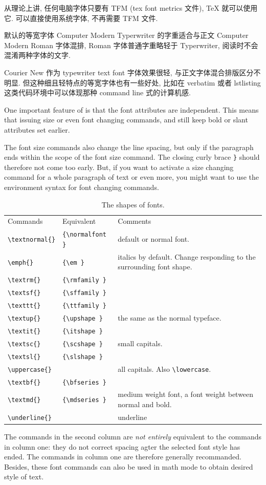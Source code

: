 \documentclass[a4paper,oneside]{book}
\begin{document}
从理论上讲, 任何电脑字体只要有 TFM (tex font metrics 文件), \TeX{} 就可以使用它. \XeTeX{} 可以直接使用系统字体, 不再需要 TFM 文件.

默认的等宽字体 Computer Modern Typerwriter 的字重适合与正文 Computer Modern Roman 字体混排, Roman 字体普通字重略轻于 Typerwriter, 阅读时不会混淆两种字体的文字.

Courier New 作为 typewriter text font 字体效果很轻, 与正文字体混合排版区分不明显. 但这种细且轻特点的等宽字体也有一些好处, 比如在 verbatim 或者 lstlisting 这类代码环境中可以体现那种 command line 式的计算机感.

One important feature of \LaTeXe{} is that the font attributes are independent. This means that issuing size or even font changing commands, and still keep bold or slant attributes set earlier.

The font size commands also change the line spacing, but only if the paragraph ends within the scope of the font size command. The closing curly brace \verb|}| should therefore not come too early.
But, if you want to activate a size changing command for a whole paragraph of text or even more, you might want to use the environment syntax for font changing commands.

\begin{table}[htbp]
  \centering
\begin{tabular}[h]{llp{6cm}}
  Commands&Equivalent&Comments\\
  \verb|\textnormal{}|&\verb|{\normalfont }|&default or normal font.\\
  \verb|\emph{}|&\verb|{\em }|& italics by default. Change responding to the surrounding font shape.\\
  \verb|\textrm{}|&\verb|{\rmfamily }|& \\
  \verb|\textsf{}|&\verb|{\sffamily }|& \\
  \verb|\texttt{}|&\verb|{\ttfamily }|& \\
  \verb|\textup{}|&\verb|{\upshape }|&the same as the normal typeface.\\
  \verb|\textit{}|&\verb|{\itshape }|& \\
  \verb|\textsc{}|&\verb|{\scshape }|&small capitals.\\
  \verb|\textsl{}|&\verb|{\slshape }|& \\
  \verb|\uppercase{}|& &all capitals. Also \verb|\lowercase|.\\
  \verb|\textbf{}|&\verb|{\bfseries }|& \\
  \verb|\textmd{}|&\verb|{\mdseries }|&medium weight font, a font weight between normal and bold.\\
  \verb|\underline{}|&&underline
\end{tabular}
  \caption{The shapes of fonts.}
\end{table}
The commands in the second column are \emph{not entirely} equivalent to the commands in column one: they do not correct spacing agter the selected font style has ended. The commands in column one are therefore generally recommanded. Besides, these font commands can also be used in math mode to obtain desired style of text.
\end{document}
